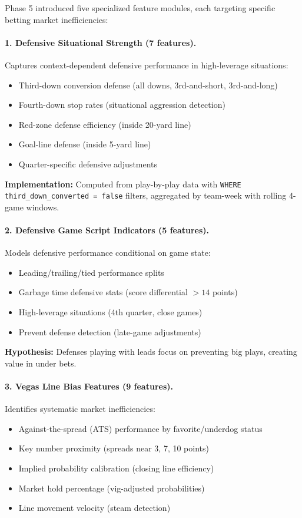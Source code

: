 Phase 5 introduced five specialized feature modules, each targeting specific betting market inefficiencies:

\paragraph{1. Defensive Situational Strength (7 features).}
Captures context-dependent defensive performance in high-leverage situations:
\begin{itemize}
  \item Third-down conversion defense (all downs, 3rd-and-short, 3rd-and-long)
  \item Fourth-down stop rates (situational aggression detection)
  \item Red-zone defense efficiency (inside 20-yard line)
  \item Goal-line defense (inside 5-yard line)
  \item Quarter-specific defensive adjustments
\end{itemize}

\noindent\textbf{Implementation:} Computed from play-by-play data with \texttt{WHERE third\_down\_converted = false} filters, aggregated by team-week with rolling 4-game windows.

\paragraph{2. Defensive Game Script Indicators (5 features).}
Models defensive performance conditional on game state:
\begin{itemize}
  \item Leading/trailing/tied performance splits
  \item Garbage time defensive stats (score differential $> 14$ points)
  \item High-leverage situations (4th quarter, close games)
  \item Prevent defense detection (late-game adjustments)
\end{itemize}

\noindent\textbf{Hypothesis:} Defenses playing with leads focus on preventing big plays, creating value in under bets.

\paragraph{3. Vegas Line Bias Features (9 features).}
Identifies systematic market inefficiencies:
\begin{itemize}
  \item Against-the-spread (ATS) performance by favorite/underdog status
  \item Key number proximity (spreads near 3, 7, 10 points)
  \item Implied probability calibration (closing line efficiency)
  \item Market hold percentage (vig-adjusted probabilities)
  \item Line movement velocity (steam detection)
\end{itemize}

